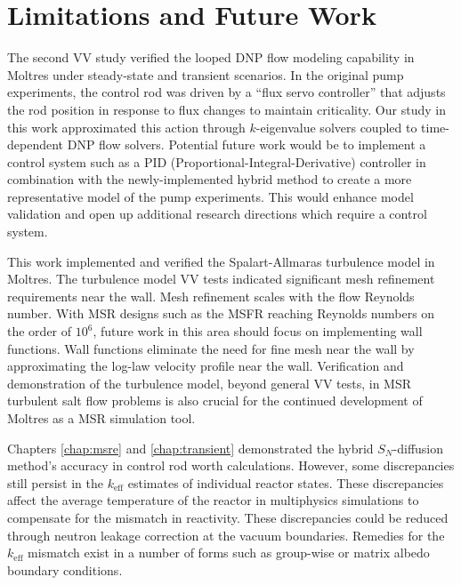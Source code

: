 \section{Limitations and Future Work}

The second \gls{VV} study verified the looped \gls{DNP} flow modeling capability in Moltres under
steady-state and transient scenarios. In the original pump experiments, the control rod was driven
by a ``flux servo controller'' that adjusts the rod position in response to flux changes to maintain
criticality. Our study in this work approximated this action through $k$-eigenvalue solvers
coupled to time-dependent \gls{DNP} flow solvers. Potential future work would be to implement a
control system such as a PID (Proportional-Integral-Derivative) controller in combination with
the newly-implemented hybrid method to create a more representative model of the pump experiments.
This would enhance model validation and open up additional research directions which require a
control system.

This work implemented and verified the Spalart-Allmaras turbulence model in Moltres. The turbulence
model \gls{VV} tests indicated significant mesh refinement requirements near the wall. Mesh
refinement scales with the flow Reynolds number. With \gls{MSR} designs such as the \gls{MSFR}
reaching Reynolds numbers on the order of $10^6$, future work in this area should focus on
implementing wall functions. Wall functions eliminate the need for fine mesh near the wall by
approximating the log-law velocity profile near the wall. Verification and demonstration of the
turbulence model, beyond general \gls{VV} tests, in \gls{MSR} turbulent salt flow problems is also
crucial for the continued development of Moltres as a \gls{MSR} simulation tool.

Chapters \ref{chap:msre} and \ref{chap:transient} demonstrated the hybrid $S_N$-diffusion method's
accuracy in control rod worth calculations. However, some discrepancies still persist in the
$k_\text{eff}$ estimates of individual reactor states. These discrepancies affect the average
temperature of the reactor in multiphysics simulations to compensate for the mismatch in
reactivity. These discrepancies could be reduced through
neutron leakage correction at the vacuum boundaries. Remedies for the $k_\text{eff}$ mismatch
exist in a number of forms such as group-wise or matrix albedo boundary conditions.

